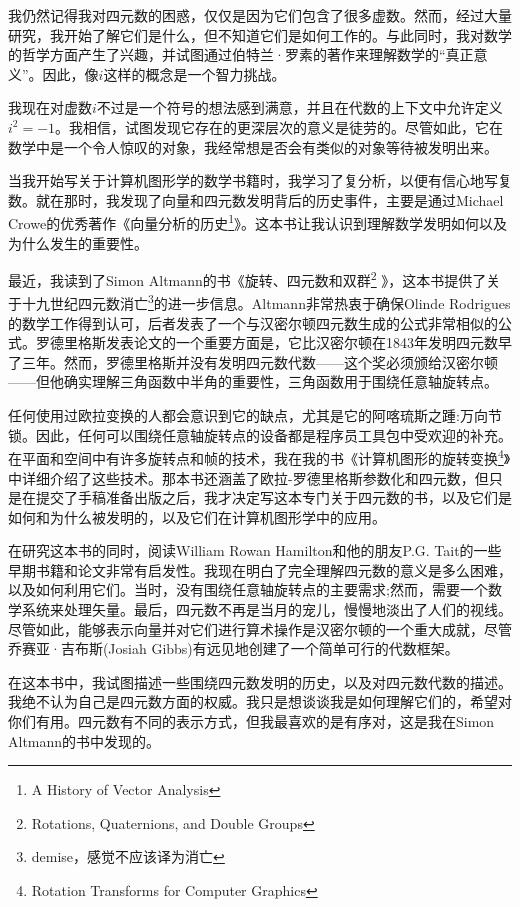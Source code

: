 我仍然记得我对四元数的困惑，仅仅是因为它们包含了很多虚数。然而，经过大量研究，我开始了解它们是什么，但不知道它们是如何工作的。与此同时，我对数学的哲学方面产生了兴趣，并试图通过伯特兰·罗素的著作来理解数学的“真正意义”。因此，像$i$这样的概念是一个智力挑战。

我现在对虚数$ i $不过是一个符号的想法感到满意，并且在代数的上下文中允许定义$ i ^{2}=-1$。我相信，试图发现它存在的更深层次的意义是徒劳的。尽管如此，它在数学中是一个令人惊叹的对象，我经常想是否会有类似的对象等待被发明出来。

当我开始写关于计算机图形学的数学书籍时，我学习了复分析，以便有信心地写复数。就在那时，我发现了向量和四元数发明背后的历史事件，主要是通过Michael Crowe的优秀著作《向量分析的历史\footnote{ A History of Vector Analysis}》。这本书让我认识到理解数学发明如何以及为什么发生的重要性。


最近，我读到了Simon Altmann的书《旋转、四元数和双群\footnote{Rotations, Quaternions, and Double Groups} 》，这本书提供了关于十九世纪四元数消亡\footnote{demise，感觉不应该译为消亡}的进一步信息。Altmann非常热衷于确保Olinde Rodrigues的数学工作得到认可，后者发表了一个与汉密尔顿四元数生成的公式非常相似的公式。罗德里格斯发表论文的一个重要方面是，它比汉密尔顿在1843年发明四元数早了三年。然而，罗德里格斯并没有发明四元数代数——这个奖必须颁给汉密尔顿——但他确实理解三角函数中半角的重要性，三角函数用于围绕任意轴旋转点。

任何使用过欧拉变换的人都会意识到它的缺点，尤其是它的阿喀琉斯之踵:万向节锁。因此，任何可以围绕任意轴旋转点的设备都是程序员工具包中受欢迎的补充。在平面和空间中有许多旋转点和帧的技术，我在我的书《计算机图形的旋转变换\footnote{Rotation Transforms for Computer Graphics}》中详细介绍了这些技术。那本书还涵盖了欧拉-罗德里格斯参数化和四元数，但只是在提交了手稿准备出版之后，我才决定写这本专门关于四元数的书，以及它们是如何和为什么被发明的，以及它们在计算机图形学中的应用。

在研究这本书的同时，阅读William Rowan Hamilton和他的朋友P.G. Tait的一些早期书籍和论文非常有启发性。我现在明白了完全理解四元数的意义是多么困难，以及如何利用它们。当时，没有围绕任意轴旋转点的主要需求;然而，需要一个数学系统来处理矢量。最后，四元数不再是当月的宠儿，慢慢地淡出了人们的视线。尽管如此，能够表示向量并对它们进行算术操作是汉密尔顿的一个重大成就，尽管乔赛亚·吉布斯(Josiah Gibbs)有远见地创建了一个简单可行的代数框架。

在这本书中，我试图描述一些围绕四元数发明的历史，以及对四元数代数的描述。我绝不认为自己是四元数方面的权威。我只是想谈谈我是如何理解它们的，希望对你们有用。四元数有不同的表示方式，但我最喜欢的是有序对，这是我在Simon Altmann的书中发现的。

